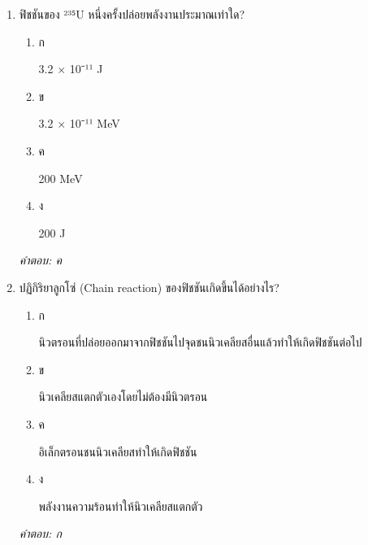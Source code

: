 \documentclass[12pt]{article}
\begin{document}
\begin{enumerate}[label=\arabic*., itemsep=0.5\baselineskip, topsep=0.5\baselineskip, leftmargin=*]
\item ฟิชชันของ ²³⁵U หนึ่งครั้งปล่อยพลังงานประมาณเท่าใด?
\begin{enumerate}[label=\alph*)., itemsep=0.3\baselineskip, topsep=0.3\baselineskip]
\item ก\ 
\begin{minipage}[t]{0.9\linewidth}
\raggedright 3.2 × 10⁻¹¹ J
\end{minipage}
\item ข\ 
\begin{minipage}[t]{0.9\linewidth}
\raggedright 3.2 × 10⁻¹¹ MeV
\end{minipage}
\item ค\ 
\begin{minipage}[t]{0.9\linewidth}
\raggedright 200 MeV
\end{minipage}
\item ง\ 
\begin{minipage}[t]{0.9\linewidth}
\raggedright 200 J
\end{minipage}
\end{enumerate}
\vspace{-0.3\baselineskip}
\begin{small}
\textit{คำตอบ: ค}
\end{small}

\item ปฏิกิริยาลูกโซ่ (Chain reaction) ของฟิชชันเกิดขึ้นได้อย่างไร?
\begin{enumerate}[label=\alph*)., itemsep=0.3\baselineskip, topsep=0.3\baselineskip]
\item ก\ 
\begin{minipage}[t]{0.9\linewidth}
\raggedright นิวตรอนที่ปล่อยออกมาจากฟิชชันไปจุดชนนิวเคลียสอื่นแล้วทำให้เกิดฟิชชันต่อไป
\end{minipage}
\item ข\ 
\begin{minipage}[t]{0.9\linewidth}
\raggedright นิวเคลียสแตกตัวเองโดยไม่ต้องมีนิวตรอน
\end{minipage}
\item ค\ 
\begin{minipage}[t]{0.9\linewidth}
\raggedright อิเล็กตรอนชนนิวเคลียสทำให้เกิดฟิชชัน
\end{minipage}
\item ง\ 
\begin{minipage}[t]{0.9\linewidth}
\raggedright พลังงานความร้อนทำให้นิวเคลียสแตกตัว
\end{minipage}
\end{enumerate}
\vspace{-0.3\baselineskip}
\begin{small}
\textit{คำตอบ: ก}
\end{small}


\end{enumerate}
\end{document}

